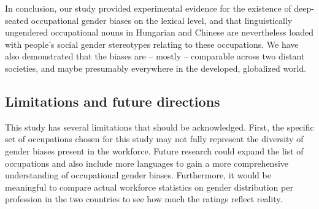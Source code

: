 \documentclass[11pt]{article}
\begin{document}
In conclusion, our study provided experimental evidence for the existence of deep-seated occupational gender biases on the lexical level, and that linguistically ungendered occupational nouns in Hungarian and Chinese are nevertheless loaded with people's social gender stereotypes relating to these occupations. We have also demonstrated that the biases are -- mostly -- comparable across two distant societies, and maybe presumably everywhere in the developed, globalized world.

\subsection{Limitations and future directions}

This study has several limitations that should be acknowledged. First, the specific set of occupations chosen for this study may not fully represent the diversity of gender biases present in the workforce. Future research could expand the list of occupations and also include more languages to gain a more comprehensive understanding of occupational gender biases. Furthermore, it would be meaningful to compare actual workforce statistics on gender distribution per profession in the two countries to see how much the ratings reflect reality.










\end{document}
